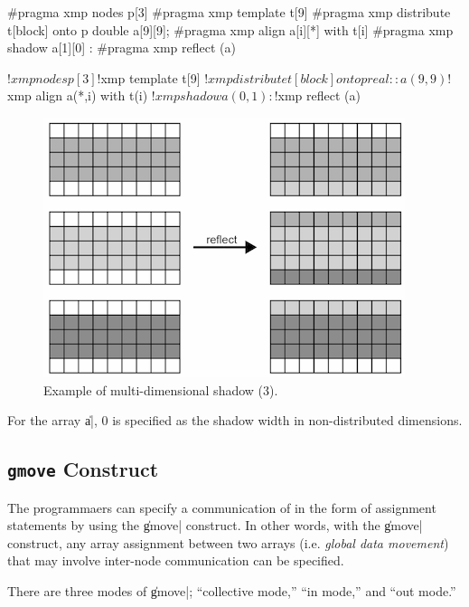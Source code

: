\begin{XCexample}
#pragma xmp nodes p[3]
#pragma xmp template t[9]
#pragma xmp distribute t[block] onto p
double a[9][9];
#pragma xmp align a[i][*] with t[i]
#pragma xmp shadow a[1][0]
  :
#pragma xmp reflect (a)
\end{XCexample}

\begin{XFexample}
!$xmp nodes p[3]
!$xmp template t[9]
!$xmp distribute t[block] onto p
real :: a(9,9)
!$xmp align a(*,i) with t(i)
!$xmp shadow a(0,1)
  :
!$xmp reflect (a)
\end{XFexample}

\begin{figure}
  \centering
  \includegraphics[width=0.9\columnwidth]{figs/1of2.png}
  \caption{Example of multi-dimensional shadow (3).}
\end{figure}

For the array \|a|, 0 is specified as the shadow width in
non-distributed dimensions.


\subsection{{\tt gmove} Construct}

The programmaers can specify a communication of {\darrays} in
the form of assignment statements by using the \|gmove| construct.
%
In other words, with the \|gmove| construct, any array assignment
between two arrays (i.e. {\it global data movement}) that may involve
inter-node communication can be specified.

There are three modes of \|gmove|; ``collective mode,'' ``in mode,'' and
``out mode.''

